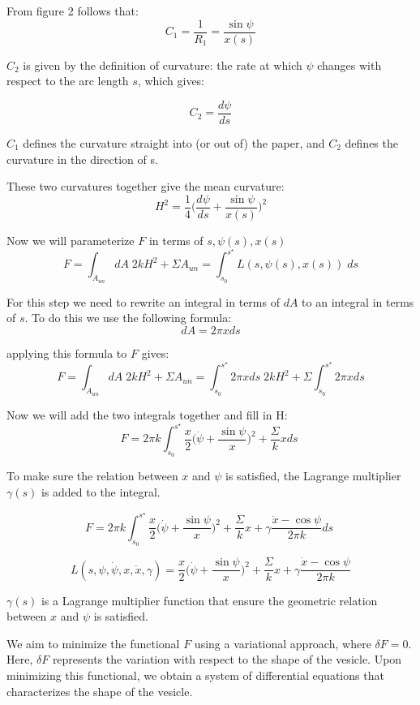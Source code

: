 \documentclass[12pt]{article}
\begin{document}
From figure 2 follows that:
$$
C_1=\frac{1}{R_1}=\frac{\sin{\psi}}{x(s)}
$$

$C_2$ is given by the definition of curvature: the rate at which $\psi$ changes with respect to the arc length $s$, which gives:

$$
C_2=\frac{d\psi}{ds}
$$

$C_1$ defines the curvature straight into (or out of) the paper, and $C_2$ defines the curvature in the direction of s. 

These two curvatures together give the mean curvature:
$$
H^2=\frac{1}{4}\bigg(\frac{d\psi}{ds}+\frac{\sin{\psi}}{x(s)}\bigg)^2
$$


Now we will parameterize $F$ in terms of $s, \psi(s), x(s)$
$$
F = \int_{A_{un}} dA \; 2kH^2  + \Sigma A_{un} = \int_{s_0}^{s^\star} L(s,\psi(s),x(s)) \; ds
$$


For this step we need to rewrite an integral in terms of $dA$ to an integral in terms of $s$. To do this we use the following formula:
$$
dA=2\pi xds
$$

applying this formula to $F$ gives:
$$
F = \int_{A_{un}} dA \; 2kH^2  + \Sigma A_{un} = \int_{s_0}^{s^\star} 2\pi xds \; 2kH^2 + \Sigma \int_{s_0}^{s^\star} 2\pi x  ds
$$

Now we will add the two integrals together and fill in H:
$$
F = 2\pi k \int_{s_0}^{s^\star} \frac{x}{2} \bigg(\dot{\psi}+\frac{\sin{\psi}}{x}\bigg)^2  + \frac{\Sigma}{k} x ds \;
$$

To make sure the relation between $x$ and $\psi$ is satisfied, the Lagrange multiplier $\gamma(s)$ is added to the integral.

$$
F = 2\pi k \int_{s_0}^{s^\star} \frac{x}{2} \bigg(\dot{\psi}+\frac{\sin{\psi}}{x}\bigg)^2  + \frac{\Sigma}{k} x +\gamma\frac{\dot{x}-\cos \psi}{2\pi k}ds\;
$$
 

$$
L(s,\psi,\dot{\psi},x,\dot{x},\gamma) = \frac{x}{2} \bigg(\dot{\psi}+\frac{\sin \psi}{x}\bigg)^2 + \frac{\Sigma}{k} x + \gamma\frac{\dot{x}-\cos \psi}{2\pi k}
$$

$\gamma(s)$ is a Lagrange multiplier function that ensure the geometric relation between $x$ and $\psi$ is satisfied.


We aim to minimize the functional \( F \) using a variational approach, where \( \delta F = 0 \). Here, \( \delta F \) represents the variation with respect to the shape of the vesicle. Upon minimizing this functional, we obtain a system of differential equations that characterizes the shape of the vesicle.
\end{document}
